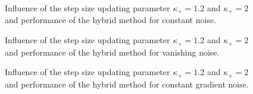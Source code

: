 \vspace{-1.5em}

\begin{figure}[H]
	\begin{subfigure}{0.49\textwidth}
	\end{subfigure}
	\begin{subfigure}{0.49\textwidth}
	\end{subfigure}
	\caption[Influence of the step size updating parameter and hybrid method: constant noise, higher dimensions]{Influence of the step size updating parameter \(\kappa_+ = 1.2\) and \(\kappa_+ =2 \) and performance of the hybrid method for constant noise.}%
	\label{fig_const_noise_comp_large}%
\end{figure}

\vspace{-1.5em}

\begin{figure}[H]
	\begin{subfigure}{0.49\textwidth}
	\end{subfigure}
	\begin{subfigure}{0.49\textwidth}
	\end{subfigure}
	\caption[Influence of the step size updating parameter and hybrid method: vanishing noise, higher dimensions]{Influence of the step size updating parameter \(\kappa_+ = 1.2\) and \(\kappa_+ =2 \) and performance of the hybrid method for vanishing noise.}%
	\label{fig_van_noise_comp_large}%
\end{figure}

\vspace{-1.5em}

\begin{figure}[H]
	\begin{subfigure}{0.49\textwidth}
	\end{subfigure}
	\begin{subfigure}{0.49\textwidth}
	\end{subfigure}
	\caption[Influence of the step size updating parameter and hybrid method: constant gradient noise, higher dimensions]{Influence of the step size updating parameter \(\kappa_+ = 1.2\) and \(\kappa_+ =2 \) and performance of the hybrid method for constant gradient noise.}%
	\label{fig_const_grad_noise_comp_large}%
\end{figure}

